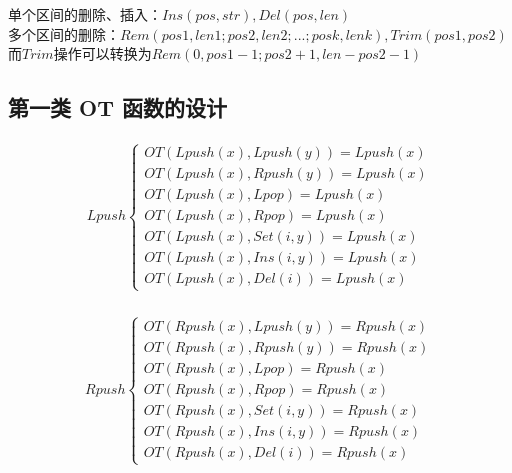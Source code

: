 \documentclass[a4paper,UTF8]{article}
\begin{document}
单个区间的删除、插入：$Ins(pos,str),Del(pos,len)$\\

多个区间的删除：$Rem(pos1,len1;pos2,len2;...;posk,lenk),Trim(pos1,pos2)$\\
而$Trim$操作可以转换为$Rem(0,pos1-1;pos2+1,len-pos2-1)$\\

\subsection{第一类 OT 函数的设计}
\begin{equation}
\begin{aligned}
Lpush\begin{cases}
 OT(Lpush(x),Lpush(y))={Lpush(x)} \\
 OT(Lpush(x),Rpush(y))= {Lpush(x)} \\
OT(Lpush(x),Lpop)=
{Lpush(x)}\\
OT(Lpush(x),Rpop)=
{Lpush(x)}\\
OT(Lpush(x),Set(i,y))=
{Lpush(x)}\\
OT(Lpush(x),Ins(i,y))=
{Lpush(x)}\\
OT(Lpush(x),Del(i))=
{Lpush(x)} \end{cases}\\
\end{aligned}
\end{equation}


\begin{equation}
\begin{aligned}
Rpush \begin{cases}
OT(Rpush(x),Lpush(y))=
{Rpush(x)}\\
OT(Rpush(x),Rpush(y))=
{Rpush(x)}\\
OT(Rpush(x),Lpop)=
{Rpush(x)}\\
OT(Rpush(x),Rpop)=
{Rpush(x)}\\
OT(Rpush(x),Set(i,y))=
{Rpush(x)}\\
OT(Rpush(x),Ins(i,y))=
{Rpush(x)}\\
OT(Rpush(x),Del(i))=
{Rpush(x)} \end{cases}\\
\end{aligned}
\end{equation}
\end{document}
